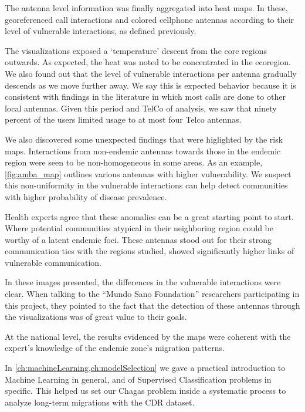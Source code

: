 
The antenna level information was finally aggregated into heat maps.
In these, georeferenced call interactions and colored cellphone antennas according to their level of vulnerable interactions, as defined previously.

The visualizations exposed a `temperature' descent from the core regions outwards.
As expected, the heat was noted to be concentrated in the ecoregion.
We also found out that the level of vulnerable interactions per antenna gradually descends as we move further away.
We say this is expected behavior because it is consistent with findings in the literature in which most calls are done to other local antennas. %
Given this period and TelCo of analysis, we saw that ninety percent of the users limited usage to at most four Telco antennas.

We also discovered some unexpected findings that were higlighted by the risk maps.
Interactions from non-endemic antennas towards those in the endemic region were seen to be non-homogeneous in some areas.
As an example, \cref{fig:amba_map} outlines various antennas with higher vulnerability.
We suspect this non-uniformity in the vulnerable interactions can help detect communities with higher probability of disease prevalence.

Health experts agree that these anomalies can be a great starting point to start.
Where potential communities atypical in their neighboring region could be worthy of a latent endemic foci.
These antennas stood out for their strong communication ties with the regions studied, showed significantly higher links of vulnerable communication.

In these images presented, the differences in the vulnerable interactions were clear.
When talking to the ``Mundo Sano Foundation'' researchers participating in this project, they pointed to the fact that the detection of these antennas through the visualizations was of great value to their goals.


At the national level, the results evidenced by the maps were coherent with the expert's knowledge of the endemic zone's migration patterns.



In \cref{ch:machineLearning,ch:modelSelection} we gave a practical introduction to Machine Learning in general, and of Supervised Classification problems in specific.
This helped us set our Chagas problem inside a systematic process to analyze long-term migrations with the CDR dataset.

